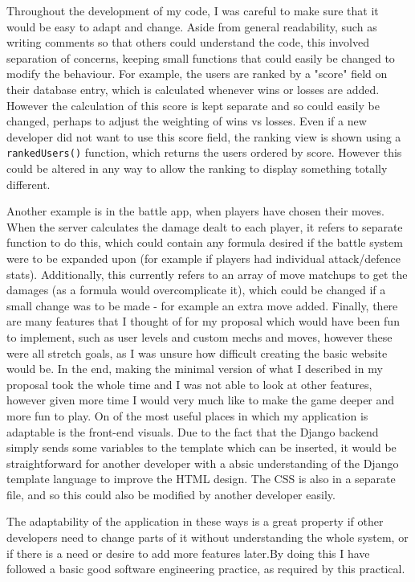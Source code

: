\documentclass{article}
\begin{document}
Throughout the development of my code, I was careful to make sure that it would be easy to adapt and change. Aside from general readability, such as writing comments so that others could understand the code, this involved separation of concerns, keeping small functions that could easily be changed to modify the behaviour. For example, the users are ranked by a "score" field on their database entry, which is calculated whenever wins or losses are added. However the calculation of this score is kept separate and so could easily be changed, perhaps to adjust the weighting of wins vs losses. Even if a new developer did not want to use this score field, the ranking view is shown using a \texttt{rankedUsers()} function, which returns the users ordered by score. However this could be altered in any way to allow the ranking to display something totally different. 

Another example is in the battle app, when players have chosen their moves. When the server calculates the damage dealt to each player, it refers to separate function to do this, which could contain any formula desired if the battle system were to be expanded upon (for example if players had individual attack/defence stats). Additionally, this currently refers to an array of move matchups to get the damages (as a formula would overcomplicate it), which could be changed if a small change was to be made - for example an extra move added.
Finally, there are many features that I thought of for my proposal which would have been fun to implement, such as user levels and custom mechs and moves, however these were all stretch goals, as I was unsure how difficult creating the basic website would be. In the end, making the minimal version of what I described in my proposal took the whole time and I was not able to look at other features, however given more time I would very much like to make the game deeper and more fun to play.
On of the most useful places in which my application is adaptable is the front-end visuals. Due to the fact that the Django backend simply sends some variables to the template which can be inserted, it would be straightforward for another developer with a absic understanding of the Django template language to improve the HTML design. The CSS is also in a separate file, and so this could also be modified by another developer easily.

The adaptability of the application in these ways is a great property if other developers need to change parts of it without understanding the whole system, or if there is a need or desire to add more features later.By doing this I have followed a basic good software engineering practice, as required by this practical.
\end{document}
